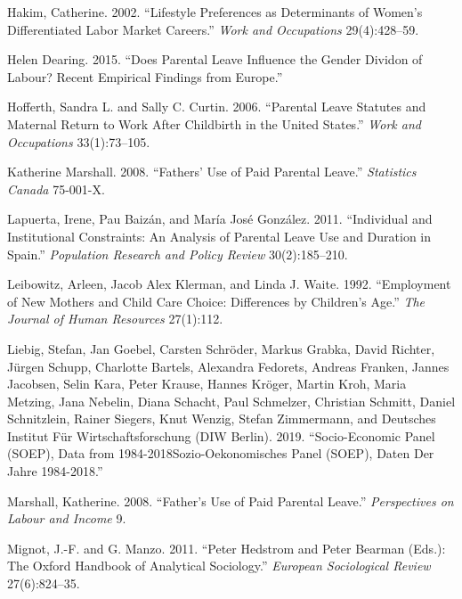 \documentclass[
  12pt,
]{article}
\begin{document}
\leavevmode\hypertarget{ref-hakim_lifestyle_2002}{}%
Hakim, Catherine. 2002. ``Lifestyle Preferences as Determinants of Women's Differentiated Labor Market Careers.'' \emph{Work and Occupations} 29(4):428--59.

\leavevmode\hypertarget{ref-helen_dearing_does_2015}{}%
Helen Dearing. 2015. ``Does Parental Leave Influence the Gender Dividon of Labour? Recent Empirical Findings from Europe.''

\leavevmode\hypertarget{ref-hofferth_parental_2006}{}%
Hofferth, Sandra L. and Sally C. Curtin. 2006. ``Parental Leave Statutes and Maternal Return to Work After Childbirth in the United States.'' \emph{Work and Occupations} 33(1):73--105.

\leavevmode\hypertarget{ref-katherine_marshall_fathers_2008}{}%
Katherine Marshall. 2008. ``Fathers' Use of Paid Parental Leave.'' \emph{Statistics Canada} 75-001-X.

\leavevmode\hypertarget{ref-lapuerta_individual_2011}{}%
Lapuerta, Irene, Pau Baizán, and María José González. 2011. ``Individual and Institutional Constraints: An Analysis of Parental Leave Use and Duration in Spain.'' \emph{Population Research and Policy Review} 30(2):185--210.

\leavevmode\hypertarget{ref-leibowitz_employment_1992}{}%
Leibowitz, Arleen, Jacob Alex Klerman, and Linda J. Waite. 1992. ``Employment of New Mothers and Child Care Choice: Differences by Children's Age.'' \emph{The Journal of Human Resources} 27(1):112.

\leavevmode\hypertarget{ref-liebig_socio-economic_2019}{}%
Liebig, Stefan, Jan Goebel, Carsten Schröder, Markus Grabka, David Richter, Jürgen Schupp, Charlotte Bartels, Alexandra Fedorets, Andreas Franken, Jannes Jacobsen, Selin Kara, Peter Krause, Hannes Kröger, Martin Kroh, Maria Metzing, Jana Nebelin, Diana Schacht, Paul Schmelzer, Christian Schmitt, Daniel Schnitzlein, Rainer Siegers, Knut Wenzig, Stefan Zimmermann, and Deutsches Institut Für Wirtschaftsforschung (DIW Berlin). 2019. ``Socio-Economic Panel (SOEP), Data from 1984-2018Sozio-Oekonomisches Panel (SOEP), Daten Der Jahre 1984-2018.''

\leavevmode\hypertarget{ref-marshall_fathers_2008}{}%
Marshall, Katherine. 2008. ``Father's Use of Paid Parental Leave.'' \emph{Perspectives on Labour and Income} 9.

\leavevmode\hypertarget{ref-mignot_peter_2011}{}%
Mignot, J.-F. and G. Manzo. 2011. ``Peter Hedstrom and Peter Bearman (Eds.): The Oxford Handbook of Analytical Sociology.'' \emph{European Sociological Review} 27(6):824--35.
\end{document}

